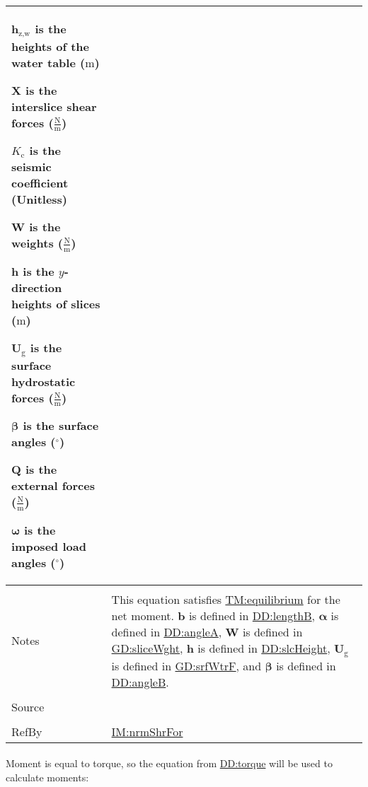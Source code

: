 \documentclass[12pt]{article}
\begin{document}
\begin{minipage}{\textwidth}
\begin{tabular}{>{\raggedright}p{}>{\raggedright\arraybackslash}p{}}
\begin{symbDescription}
              \item{${\symbf{h}_{\text{z,w}}}$ is the heights of the water table (${\text{m}}$)}
              \item{$\symbf{X}$ is the interslice shear forces ($\frac{\text{N}}{\text{m}}$)}
              \item{${K_{\text{c}}}$ is the seismic coefficient (Unitless)}
              \item{$\symbf{W}$ is the weights ($\frac{\text{N}}{\text{m}}$)}
              \item{$\symbf{h}$ is the $y$-direction heights of slices (${\text{m}}$)}
              \item{${\symbf{U}_{\text{g}}}$ is the surface hydrostatic forces ($\frac{\text{N}}{\text{m}}$)}
              \item{$\symbf{β}$ is the surface angles (${{}^{\circ}}$)}
              \item{$\symbf{Q}$ is the external forces ($\frac{\text{N}}{\text{m}}$)}
              \item{$\symbf{ω}$ is the imposed load angles (${{}^{\circ}}$)}
              \end{symbDescription}
\\ \midrule \\
Notes & This equation satisfies \hyperref[TM:equilibrium]{TM:equilibrium} for the net moment. $\symbf{b}$ is defined in \hyperref[DD:lengthB]{DD:lengthB}, $\symbf{α}$ is defined in \hyperref[DD:angleA]{DD:angleA}, $\symbf{W}$ is defined in \hyperref[GD:sliceWght]{GD:sliceWght}, $\symbf{h}$ is defined in \hyperref[DD:slcHeight]{DD:slcHeight}, ${\symbf{U}_{\text{g}}}$ is defined in \hyperref[GD:srfWtrF]{GD:srfWtrF}, and $\symbf{β}$ is defined in \hyperref[DD:angleB]{DD:angleB}.
        
\\ \midrule \\
Source & \cite{chen2005}
         
\\ \midrule \\
RefBy & \hyperref[IM:nrmShrFor]{IM:nrmShrFor}
        
\\ \bottomrule
\end{tabular}
\end{minipage}
\paragraph{}
\label{GD:momentEqlDeriv}
Moment is equal to torque, so the equation from \hyperref[DD:torque]{DD:torque} will be used to calculate moments:
\end{document}
